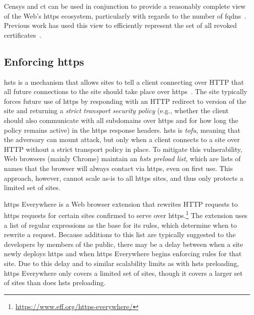 Censys and \ac{ct} can be used in conjunction to provide a reasonably complete
view of the Web's \ac{https} ecosystem, particularly with regards to the number
of \acp{fqdn}~\cite{vandersloot2016towards}. 
Previous work has used this view to efficiently represent 
the set of all revoked certificates~\cite{larisch2017crlite}.

\subsection{Enforcing \ac{https}}

\ac{hsts} is a mechanism that allows sites to tell a client connecting over HTTP
that all future connections to the site should take place over
\ac{https}~\cite{rfc6797}. The site typically forces future use of \ac{https} by
responding with an HTTP redirect to  version of the site and
returning a \emph{strict transport security policy} (e.g., whether the client
should also communicate with all subdomains over \ac{https} and for how long the
policy remains active) in the \ac{https} response headers. \ac{hsts} is
\emph{\ac{tofu}}, meaning that the adversary can mount  attack, but
only when a client connects to a site over HTTP without a strict transport
policy in place. To mitigate this vulnerability, Web browsers (mainly Chrome)
maintain an \emph{\ac{hsts} preload list}, which are lists of names that the
browser will always contact via \ac{https}, even on first use. This approach,
however, cannot scale as-is to all \ac{https} sites, and thus only protects a
limited set of sites.

\ac{https} Everywhere is a Web browser extension that rewrites HTTP requests to
\ac{https} requests for certain sites confirmed to serve over
\ac{https}.\footnote{\url{https://www.eff.org/https-everywhere/}} The extension
uses a list of regular expressions as the base for its rules, which determine
when to rewrite a request. Because additions to this list are typically
suggested to the developers by members of the public, there may be a delay
between when a site newly deploys \ac{https} and when \ac{https} Everywhere
begins enforcing rules for that site. Due to this delay and to similar
scalability limits as with \ac{hsts} preloading, \ac{https} Everywhere only
covers a limited set of sites, though it covers a larger set of sites than does
\ac{hsts} preloading.

